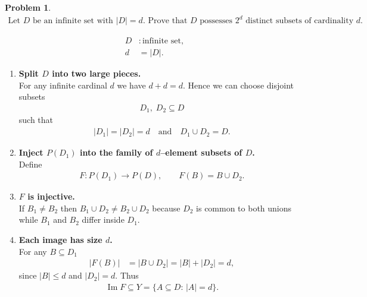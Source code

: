 \documentclass[12pt]{article}
\theoremstyle{definition} %
\newtheorem{problem}{Problem}
\theoremstyle{plain} %
\begin{document}
\begin{problem}
    \begin{align}
        \text{Let $D$ be an infinite set with $|D|=d$.  Prove that $D$ possesses $2^{d}$ distinct subsets of cardinality $d$.}
    \end{align}

    \begin{align}
        D &: \text{infinite set},\\
        d &= |D|.
    \end{align}

    \begin{enumerate}
        \item \textbf{Split $D$ into two large pieces.}\\
              For any infinite cardinal $d$ we have $d+d=d$.  
              Hence we can choose disjoint subsets
              \begin{align}
                  D_1,\;D_2\subseteq D
              \end{align}
              such that
              \begin{align}
                  |D_1|=|D_2|=d
                  \quad\text{and}\quad
                  D_1\cup D_2=D.
              \end{align}

        \item \textbf{Inject $P(D_1)$ into the family of $d$–element subsets of $D$.}\\
              Define
              \begin{align}
                  F:P(D_1)\longrightarrow P(D),
                  \qquad
                  F(B)=B\cup D_2.
              \end{align}

        \item \textbf{$F$ is injective.}\\
              If $B_1\neq B_2$ then $B_1\cup D_2\neq B_2\cup D_2$ because 
              $D_2$ is common to both unions while $B_1$ and $B_2$ differ inside $D_1$.

        \item \textbf{Each image has size $d$.}\\
              For any $B\subseteq D_1$
              \begin{align}
                  |F(B)|
                  &=|B\cup D_2|
                    =|B|+|D_2|
                    =d,
              \end{align}
              since $|B|\le d$ and $|D_2|=d$.  
              Thus
              \begin{align}
                  \operatorname{Im}F\subseteq 
                  Y=\{A\subseteq D:\,|A|=d\}.
              \end{align}


\end{enumerate}
\end{problem}
\end{document}
